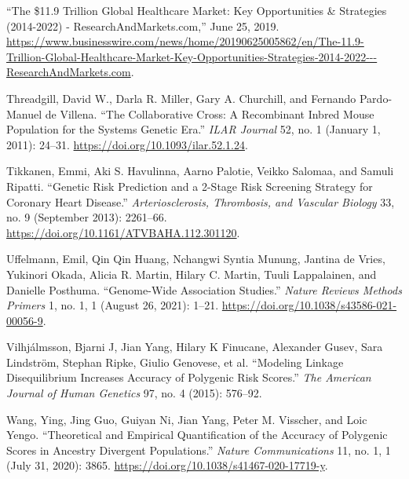 \documentclass[
]{book}
\newlength{\cslhangindent}
\newlength{\cslentryspacingunit} %
\newenvironment{CSLReferences}[2] %
 {%
  \setlength{\parindent}{0pt}
  \ifodd #1
  \let\oldpar\par
  \def\par{\hangindent=\cslhangindent\oldpar}
  \fi
  \setlength{\parskip}{#2\cslentryspacingunit}
 }%
 {}
\begin{document}
\begin{CSLReferences}{1}{0}
\leavevmode{}%
{``The \$11.9 {Trillion Global Healthcare Market}: {Key Opportunities} \& {Strategies} (2014-2022) - {ResearchAndMarkets}.com,''} June 25, 2019. \url{https://www.businesswire.com/news/home/20190625005862/en/The-11.9-Trillion-Global-Healthcare-Market-Key-Opportunities-Strategies-2014-2022---ResearchAndMarkets.com}.

\leavevmode{}%
Threadgill, David W., Darla R. Miller, Gary A. Churchill, and Fernando Pardo-Manuel de Villena. {``The {Collaborative Cross}: {A Recombinant Inbred Mouse Population} for the {Systems Genetic Era}.''} \emph{ILAR Journal} 52, no. 1 (January 1, 2011): 24--31. \url{https://doi.org/10.1093/ilar.52.1.24}.

\leavevmode{}%
Tikkanen, Emmi, Aki S. Havulinna, Aarno Palotie, Veikko Salomaa, and Samuli Ripatti. {``Genetic {Risk Prediction} and a 2-{Stage Risk Screening Strategy} for {Coronary Heart Disease}.''} \emph{Arteriosclerosis, Thrombosis, and Vascular Biology} 33, no. 9 (September 2013): 2261--66. \url{https://doi.org/10.1161/ATVBAHA.112.301120}.

\leavevmode{}%
Uffelmann, Emil, Qin Qin Huang, Nchangwi Syntia Munung, Jantina de Vries, Yukinori Okada, Alicia R. Martin, Hilary C. Martin, Tuuli Lappalainen, and Danielle Posthuma. {``Genome-Wide Association Studies.''} \emph{Nature Reviews Methods Primers} 1, no. 1, 1 (August 26, 2021): 1--21. \url{https://doi.org/10.1038/s43586-021-00056-9}.

\leavevmode{}%
Vilhjálmsson, Bjarni J, Jian Yang, Hilary K Finucane, Alexander Gusev, Sara Lindström, Stephan Ripke, Giulio Genovese, et al. {``Modeling Linkage Disequilibrium Increases Accuracy of Polygenic Risk Scores.''} \emph{The American Journal of Human Genetics} 97, no. 4 (2015): 576--92.

\leavevmode{}%
Wang, Ying, Jing Guo, Guiyan Ni, Jian Yang, Peter M. Visscher, and Loic Yengo. {``Theoretical and Empirical Quantification of the Accuracy of Polygenic Scores in Ancestry Divergent Populations.''} \emph{Nature Communications} 11, no. 1, 1 (July 31, 2020): 3865. \url{https://doi.org/10.1038/s41467-020-17719-y}.


\end{CSLReferences}
\end{document}
